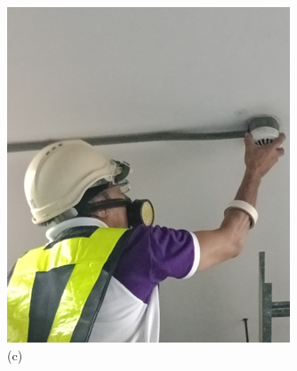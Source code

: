 \begin{figure}[h]
\begin{minipage}[b]{0.22\linewidth}
		\includegraphics[width=\textwidth]{figures/ch02_fdas03}
		\caption*{(c)}
	\end{minipage}
	\hspace{0.05cm}
	\begin{minipage}[b]{0.22\linewidth}
		\centering

\end{minipage}
\end{figure}
